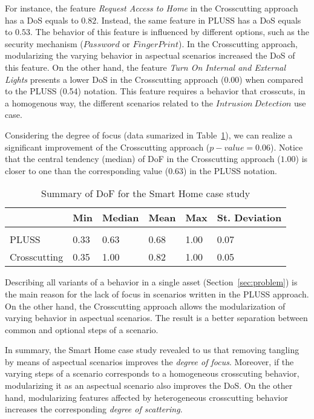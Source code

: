 For instance, the feature \emph{Request Access to Home} in the Crosscutting
approach has a DoS equals to $0.82$. Instead, the same feature in PLUSS has a
DoS equals to $0.53$. The behavior of this feature is influenced by different
options, such as the security mechanism ($Password$ or $Finger Print$).
In the Crosscutting approach, modularizing the varying behavior in
aspectual scenarios increased the DoS of this feature.
On the other hand, the feature \emph{Turn On Internal and External Lights}
presents a lower DoS in the Crosscutting approach (0.00) when compared to the
PLUSS (0.54) notation. This feature requires a behavior that crosscuts, in a
homogenous way, the different scenarios related to the $Intrusion\ Detection$
use case.

Considering the degree of focus (data sumarized in Table~\ref{tab:sh-dof}), we
can realize a significant improvement of the Crosscutting approach
($p-value=0.06$). Notice that the central tendency (median) of DoF in the
Crosscutting approach ($1.00$) is closer to one than the corresponding value
($0.63$) in the PLUSS notation.

\begin{table}[htb] \centering
\caption{Summary of DoF for the Smart Home case study}
\label{tab:sh-dof}
\begin{small}
\begin{tabular}{llllll} \hline
					& Min 	& Median 	& Mean 	& Max 	& St. Deviation \\ \hline \\
	PLUSS			& 0.33  & 0.63   	& 0.68  & 1.00 	& 0.07 			\\
	Crosscutting	& 0.35  & 1.00   	& 0.82 	& 1.00 	& 0.05			\\ \hline	
\end{tabular}
\end{small}
\end{table}

Describing all variants of a behavior in a single asset
(Section~\ref{sec:problem}) is the main reason for the lack of focus in scenarios
written in the PLUSS approach. On the other hand, the Crosscutting approach
allows the modularization of varying behavior in aspectual scenarios. The result
is a better separation between common and optional steps of a scenario.

In summary, the Smart Home case study revealed to us that removing tangling by
means of aspectual scenarios improves the \emph{degree of focus}. Moreover, if
the varying steps of a scenario corresponds to a homogeneous crosscuting
behavior, modularizing it as an aspectual scenario also improves the DoS. On the
other hand, modularizing features affected by heterogeneous crosscutting
behavior increases the corresponding \emph{degree of scattering}.

